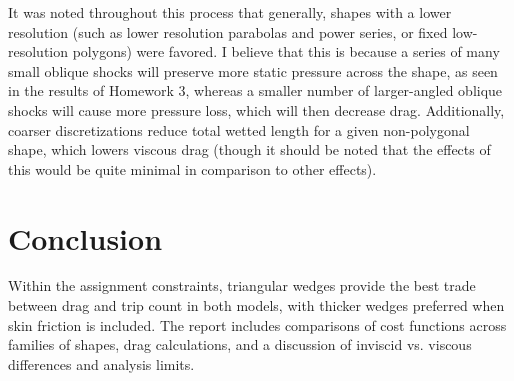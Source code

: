 \documentclass[11pt]{article}
\begin{document}
It was noted throughout this process that generally, shapes with a lower resolution (such as lower resolution parabolas and power series, or fixed low-resolution polygons) were favored. I believe that this is because a series of many small oblique shocks will preserve more static pressure across the shape, as seen in the results of Homework 3, whereas a smaller number of larger-angled oblique shocks will cause more pressure loss, which will then decrease drag. Additionally, coarser discretizations reduce total wetted length for a given non-polygonal shape, which lowers viscous drag (though it should be noted that the effects of this would be quite minimal in comparison to other effects).

\section{Conclusion}
Within the assignment constraints, triangular wedges provide the best trade between drag and trip count in both models, with thicker wedges preferred when skin friction is included. The report includes comparisons of cost functions across families of shapes, drag calculations, and a discussion of inviscid vs. viscous differences and analysis limits.

\printbibliography
\end{document}

